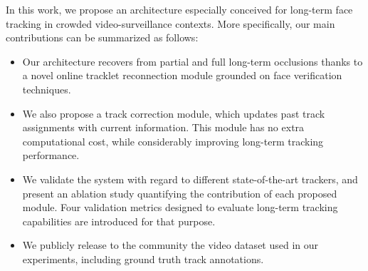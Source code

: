 In this work, we propose an architecture especially conceived for long-term face tracking in crowded video-surveillance contexts. More specifically, our main contributions can be summarized as follows:

\begin{itemize}
    \item Our architecture recovers from partial and full long-term occlusions thanks to a novel online tracklet reconnection module grounded on face verification techniques.
    \item We also propose a track correction module, which updates past track assignments with current information. This module has no extra computational cost, while considerably improving long-term tracking performance.
    \item We validate the system with regard to different state-of-the-art trackers, and present an ablation study quantifying the contribution of each proposed module. Four validation metrics designed to evaluate long-term tracking capabilities are introduced for that purpose.
    \item We publicly release to the community the video dataset used in our experiments, including ground truth track annotations.
\end{itemize}


